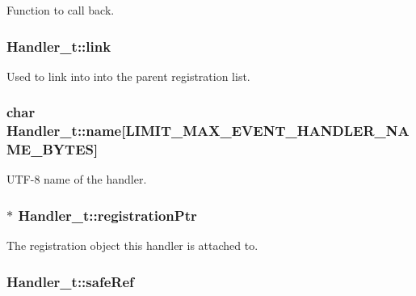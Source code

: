 Function to call back. 

\subsubsection[{\texorpdfstring{link}{link}}]{ Handler\+\_\+t\+::link}\hypertarget{struct_handler__t_ab3c156fcf27a1eedf532bfd2fc8f4dab}{}\label{struct_handler__t_ab3c156fcf27a1eedf532bfd2fc8f4dab}
Used to link into into the parent registration list. 
\subsubsection[{\texorpdfstring{name}{name}}]{\setlength{\rightskip}{0pt plus 5cm}char Handler\+\_\+t\+::name\mbox{[}{\bf L\+I\+M\+I\+T\+\_\+\+M\+A\+X\+\_\+\+E\+V\+E\+N\+T\+\_\+\+H\+A\+N\+D\+L\+E\+R\+\_\+\+N\+A\+M\+E\+\_\+\+B\+Y\+T\+ES}\mbox{]}}\hypertarget{struct_handler__t_adde45937f8deff4c4a02601845fdfb39}{}\label{struct_handler__t_adde45937f8deff4c4a02601845fdfb39}


U\+T\+F-\/8 name of the handler. 

\subsubsection[{\texorpdfstring{registration\+Ptr}{registrationPtr}}]{$\ast$ Handler\+\_\+t\+::registration\+Ptr}\hypertarget{struct_handler__t_a12e13c23399fd619d22fc5b979494e31}{}\label{struct_handler__t_a12e13c23399fd619d22fc5b979494e31}
The registration object this handler is attached to. 
\subsubsection[{\texorpdfstring{safe\+Ref}{safeRef}}]{ Handler\+\_\+t\+::safe\+Ref}\hypertarget{struct_handler__t_a6c39728cb6b6e64da5f14b2803c0f6c2}{}\label{struct_handler__t_a6c39728cb6b6e64da5f14b2803c0f6c2}


